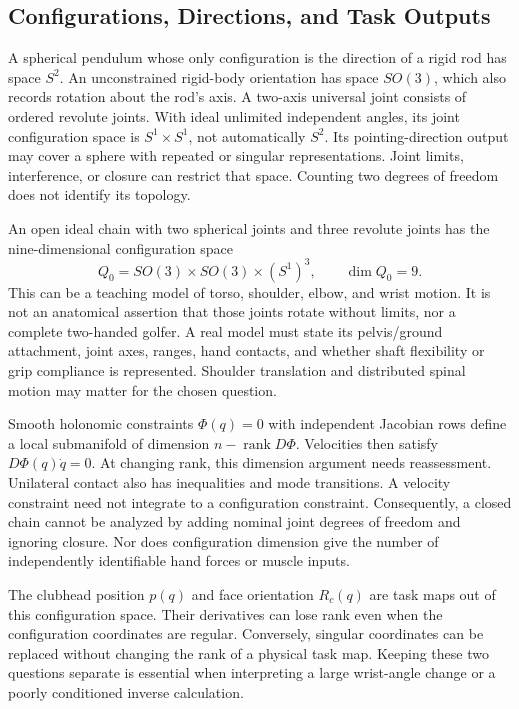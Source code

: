 \documentclass[12pt, openany]{book}
\theoremstyle{plain}
\begin{document}
\subsection{Configurations, Directions, and Task Outputs}

A spherical pendulum whose only configuration is the direction of a rigid rod
has space $S^2$. An unconstrained rigid-body orientation has space $SO(3)$,
which also records rotation about the rod's axis. A two-axis universal joint
consists of ordered revolute joints. With ideal unlimited independent angles,
its joint configuration space is $S^1\times S^1$, not automatically $S^2$.
Its pointing-direction output may cover a sphere with repeated or singular
representations. Joint limits, interference, or closure can restrict that
space. Counting two degrees of freedom does not identify its topology.

An open ideal chain with two spherical joints and three revolute joints has
the nine-dimensional configuration space
\begin{equation}\label{eq:golf_config}
 Q_0=SO(3)\times SO(3)\times(S^1)^3,\qquad \dim Q_0=9.
\end{equation}
This can be a teaching model of torso, shoulder, elbow, and wrist motion.
It is not an anatomical assertion that those joints rotate without limits,
nor a complete two-handed golfer. A real model must state its pelvis/ground
attachment, joint axes, ranges, hand contacts, and whether shaft flexibility
or grip compliance is represented. Shoulder translation and distributed
spinal motion may matter for the chosen question.

Smooth holonomic constraints $\Phi(q)=0$ with independent Jacobian rows define
a local submanifold of dimension $n-\operatorname{rank}D\Phi$. Velocities then
satisfy $D\Phi(q)\dot q=0$. At changing rank, this dimension argument needs
reassessment. Unilateral contact also has inequalities and mode transitions.
A velocity constraint need not integrate to a configuration constraint.
Consequently, a closed chain cannot be analyzed by adding nominal joint
degrees of freedom and ignoring closure. Nor does configuration dimension
give the number of independently identifiable hand forces or muscle inputs.

The clubhead position $p(q)$ and face orientation $R_c(q)$ are task maps out
of this configuration space. Their derivatives can lose rank even when the
configuration coordinates are regular. Conversely, singular coordinates can
be replaced without changing the rank of a physical task map. Keeping these
two questions separate is essential when interpreting a large wrist-angle
change or a poorly conditioned inverse calculation.
\end{document}
